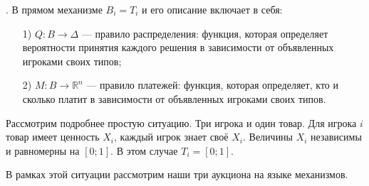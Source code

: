 \begin{mydef} . В прямом механизме $ B_{i}=T_{i} $ и его описание включает в себя:
\begin{enumerate}
\item[1)] $ Q:B\to \Delta $ — правило распределения: функция, которая определяет вероятности принятия каждого решения в зависимости от объявленных игроками своих типов;
\item[2)] $ M:B\to \mathbb{R}^{n}  $ — правило платежей: функция, которая определяет, кто и сколько платит в зависимости от объявленных игроками своих типов.
\end{enumerate}
\end{mydef}


Рассмотрим подробнее простую ситуацию. Три игрока и один товар. Для игрока $ i $ товар имеет ценность $ X_{i} $, каждый игрок знает своё $ X_{i} $. Величины $ X_{i}  $ независимы и равномерны на $ [0;1] $. В этом случае $ T_{i}=[0;1] $.

В рамках этой ситуации рассмотрим наши три аукциона на языке механизмов.






